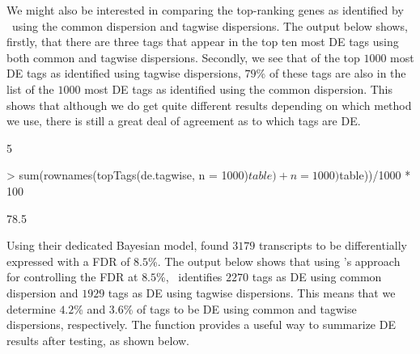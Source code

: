 We might also be interested in comparing the top-ranking genes as
identified by \edgeR~using the common dispersion and tagwise
dispersions. The output below shows, firstly, that there are three
tags that appear in the top ten most DE tags using both common and
tagwise dispersions. Secondly, we see that of the top $1000$ most DE
tags as identified using tagwise dispersions, $79$\% of these tags are
also in the list of the $1000$ most DE tags as identified using the
common dispersion. This shows that although we do get quite different
results depending on which method we use, there is still a great deal
of agreement as to which tags are DE.

\begin{Schunk}
\begin{Soutput}
[1] 5
\end{Soutput}
\begin{Sinput}
> sum(rownames(topTags(de.tagwise, n = 1000)$table) %
+     n = 1000)$table))/1000 * 100
\end{Sinput}
\begin{Soutput}
[1] 78.5
\end{Soutput}
\end{Schunk}

Using their dedicated Bayesian model, \citet{THoen:2008p9} found
$3179$ transcripts to be differentially expressed with a FDR of
$8.5$\%. The output below shows that using \citet{Benjamini95}'s
approach for controlling the FDR at $8.5$\%, \edgeR~identifies $2270$
tags as DE using common dispersion and $1929$ tags as DE using tagwise
dispersions. This means that we determine $4.2$\% and $3.6$\% of
tags to be DE using common and tagwise dispersions, respectively. The
 function provides a useful way to summarize DE
results after testing, as shown below.

